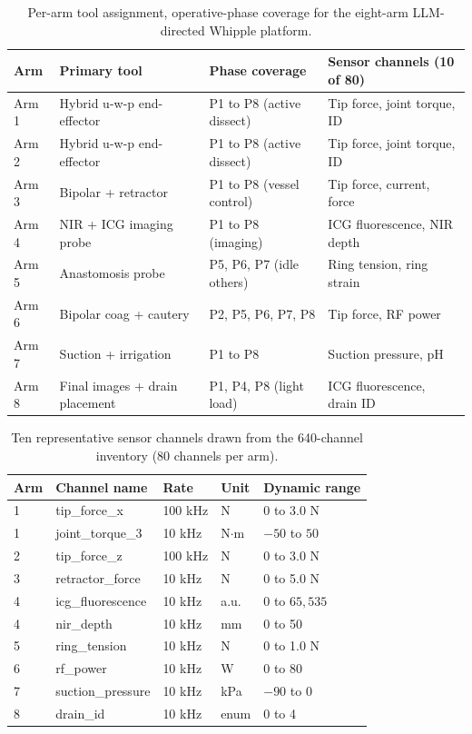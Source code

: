 \begin{table}[t]
\caption{Per-arm tool assignment, operative-phase coverage for the eight-arm LLM-directed Whipple platform.}
\label{tab:sec06-arms}
\centering
\begin{tabularx}{\textwidth}{L{1.2cm} L{4.9cm} L{4.0cm} Y}
\toprule
\textbf{Arm} & \textbf{Primary tool} & \textbf{Phase coverage} & \textbf{Sensor channels (10 of 80)} \\
\midrule
Arm 1 & Hybrid u-w-p end-effector & P1 to P8 (active dissect) & Tip force, joint torque, ID \\
Arm 2 & Hybrid u-w-p end-effector & P1 to P8 (active dissect) & Tip force, joint torque, ID \\
Arm 3 & Bipolar + retractor & P1 to P8 (vessel control) & Tip force, current, force \\
Arm 4 & NIR + ICG imaging probe & P1 to P8 (imaging) & ICG fluorescence, NIR depth \\
Arm 5 & Anastomosis probe & P5, P6, P7 (idle others) & Ring tension, ring strain \\
Arm 6 & Bipolar coag + cautery & P2, P5, P6, P7, P8 & Tip force, RF power \\
Arm 7 & Suction + irrigation & P1 to P8 & Suction pressure, pH \\
Arm 8 & Final images + drain placement & P1, P4, P8 (light load) & ICG fluorescence, drain ID \\
\bottomrule
\end{tabularx}
\end{table}

\begin{table}[t]
\caption{Ten representative sensor channels drawn from the 640-channel inventory
(80 channels per arm).}
\label{tab:sec06-sensors}
\centering
\begin{tabularx}{\textwidth}{L{1.0cm} L{3.8cm} L{3cm} L{2.4cm} Y}
\toprule
\textbf{Arm} & \textbf{Channel name} & \textbf{Rate} & \textbf{Unit} & \textbf{Dynamic range} \\
 & tip\_force\_x & 100 kHz & N & 0 to 3.0 N \\
1 & joint\_torque\_3 & 10 kHz & N$\cdot$m & $-50$ to $50$ \\
2 & tip\_force\_z & 100 kHz & N & 0 to 3.0 N \\
3 & retractor\_force & 10 kHz & N & 0 to 5.0 N \\
4 & icg\_fluorescence & 10 kHz & a.u. & 0 to $65{,}535$ \\
4 & nir\_depth & 10 kHz & mm & 0 to 50 \\
5 & ring\_tension & 10 kHz & N & 0 to 1.0 N \\
6 & rf\_power & 10 kHz & W & 0 to 80 \\
7 & suction\_pressure & 10 kHz & kPa & $-90$ to 0 \\
8 & drain\_id & 10 kHz & enum & 0 to 4 \\
\bottomrule
\end{tabularx}
\end{table}

